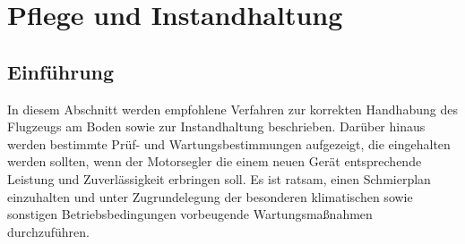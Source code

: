 \chapter{Pflege und Instandhaltung}
\section{Einführung}
In diesem Abschnitt werden empfohlene Verfahren zur korrekten Handhabung des Flugzeugs am Boden sowie zur Instandhaltung beschrieben. Darüber hinaus werden bestimmte Prüf- und Wartungsbestimmungen aufgezeigt, die eingehalten werden sollten, wenn der Motorsegler die einem neuen Gerät entsprechende Leistung und Zuverlässigkeit erbringen soll. Es ist ratsam, einen Schmierplan einzuhalten und unter Zugrundelegung der besonderen klimatischen sowie sonstigen Betriebsbedingungen vorbeugende Wartungsmaßnahmen durchzuführen.

%

